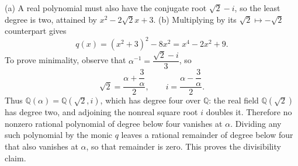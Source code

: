 (a) A real polynomial must also have the conjugate root $\sqrt2-i$, so the least degree is two, attained by $\boxed{x^2-2\sqrt2x+3}$.
(b) Multiplying by its $\sqrt2\mapsto-\sqrt2$ counterpart gives
\[
\boxed{q(x)=(x^2+3)^2-8x^2=x^4-2x^2+9}.
\]
To prove minimality, observe that $\alpha^{-1}=\dfrac{\sqrt2-i}{3}$, so
\[
\sqrt2=\dfrac{\alpha+\dfrac{3}{\alpha}}{2},\qquad i=\dfrac{\alpha-\dfrac{3}{\alpha}}{2}.
\]
Thus $\mathbb Q(\alpha)=\mathbb Q(\sqrt2,i)$, which has degree four over $\mathbb Q$: the real field $\mathbb Q(\sqrt2)$ has degree two, and adjoining the nonreal square root $i$ doubles it. Therefore no nonzero rational polynomial of degree below four vanishes at $\alpha$. Dividing any such polynomial by the monic $q$ leaves a rational remainder of degree below four that also vanishes at $\alpha$, so that remainder is zero. This proves the divisibility claim.
